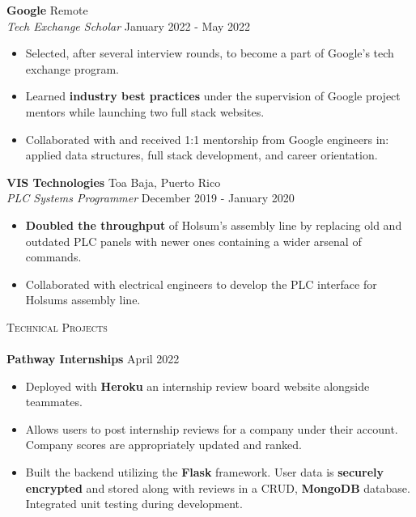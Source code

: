 \documentclass[a4paper]{article}
\newcommand{\lineunder} {
    \vspace*{-8pt} \\
    \hspace*{-18pt} \hrulefill \\
}
\newcommand{\header} [1] {
    {\hspace*{-18pt}\vspace*{6pt} \textsc{#1}}
    \vspace*{-6pt} \lineunder
}
\begin{document}
\textbf{Google} \hfill Remote\\
\textit{Tech Exchange Scholar} \hfill January 2022 - May 2022\\
\vspace{-2mm}
\begin{itemize} \itemsep -1pt
	\item Selected, after several interview rounds, to become a part of Google's tech exchange program. 
	\item Learned \textbf{industry best practices} under the supervision of Google project mentors while launching two full stack websites.
	\item Collaborated with and received 1:1 mentorship from Google engineers in: applied data structures, full stack development, and career orientation.
\end{itemize}

\textbf{VIS Technologies} \hfill Toa Baja, Puerto Rico\\
\textit{PLC Systems Programmer} \hfill December 2019 - January 2020\\
\vspace{-2mm}
\begin{itemize} \itemsep -1pt
	\item \textbf{Doubled the throughput} of Holsum's assembly line by replacing old and outdated PLC panels with newer ones containing a wider arsenal of commands.
	\item Collaborated with electrical engineers to develop the PLC interface for Holsum\textquotesingle{}s assembly line.
\end{itemize}

\header{Technical Projects}
{\textbf{Pathway Internships}} \hfill April 2022 \\
\vspace{-1mm}
\begin{itemize} \itemsep -1pt
\item Deployed with \textbf{Heroku} an internship review board website alongside teammates.

\item Allows users to post internship reviews for a company under their account. Company scores are appropriately updated and ranked.

\item Built the backend utilizing the \textbf{Flask} framework. User data is \textbf{securely encrypted} and stored along with reviews in a CRUD, \textbf{MongoDB} database. Integrated unit testing during development.
\end{itemize}
\end{document}
